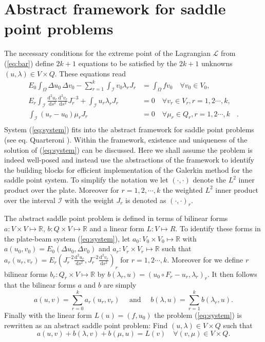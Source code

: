 \documentclass{marine_2015}
\newcommand{\inner}[2]{\ensuremath{\left(#1, #2\right)}}
\newcommand{\rinner}[2]{\ensuremath{\left(#1, #2\right)_r}}
\newcommand{\ainner}[2]{\ensuremath{a\left(#1, #2\right)}}
\newcommand{\arinner}[2]{\ensuremath{a_r\left(#1, #2\right)}}
\newcommand{\binner}[2]{\ensuremath{b\left(#1, #2\right)}}
\newcommand{\brinner}[2]{\ensuremath{b\left(#1, #2\right)}}
\newcommand{\Linner}[1]{\ensuremath{L\left(#1\right)}}
\newcommand{\deriv}[2]{\ensuremath{\frac{\mathrm{d}#1}{\mathrm{d}#2}}}
\newcommand{\tderiv}[2]{\ensuremath{\tfrac{\mathrm{d}#1}{\mathrm{d}#2}}}
\begin{document}
\section{Abstract framework for saddle point problems}
\label{sec:abstract}
The necessary conditions for the extreme point of the Lagrangian $\mathcal{L}$
from (\ref{eq:bar}) define $2k+1$ equations to be satisfied by the $2k+1$
unknowns $\left(u, \lambda\right)\in V\times Q$. These equations read
\[
  \begin{aligned}
    \label{eq:system}
    E_0\displaystyle\int_{\Omega}\Delta u_0\,\Delta v_0-
    \sum_{r=1}^k\int_{\mathcal{I}}v_0\lambda_r J_r &=\displaystyle\int_{\Omega}f
    v_0\quad\forall v_0\in V_0,& \\
    E_r\displaystyle\int_{\mathcal{I}}
    \deriv{^2u_r}{s^2}\deriv{^2v_r}{s^2}J_r^{-3} +
  \int_{\mathcal{I}} u_r \lambda_r J_r &= 0\quad\forall v_r\in V_r, r=1,
    2\cdots, k,&\\
  \int_{\mathcal{I}}\left(u_r-u_0\right)\mu_r J_r &= 0\quad\forall \mu_r\in Q_r,
    r=1, 2\cdots, k&.\\
  \end{aligned}
\]
System (\ref{eq:system}) fits into the abstract framework for saddle point
problems (see eq. Quarteroni \cite{quarteroni}). Within the framework, existence
and uniqueness of the solution of (\ref{eq:system}) can be discussed. Here we
shall assume the problem is indeed well-posed and instead use the abstractions
of the framework to identify the building blocks for efficient implementation
of the Galerkin method for the saddle point system. To simplify the notation we
let $\inner{\cdot}{\cdot}$ denote the $L^2$ inner product over the plate.
Moreover for $r=1, 2, \cdots, k$ the weighted $L^2$ inner product over the
interval $\mathcal{I}$ with the weight $J_r$ is denoted as $\rinner{\cdot}{\cdot}$.

The abstract saddle point problem is defined in terms of bilinear forms $a:V\times V\mapsto \mathbb{R}$,
$b:Q\times V\mapsto \mathbb{R}$ and a linear form $L:V\mapsto R$. To identify these 
forms in the plate-beam system (\ref{eq:system}), let $a_0:V_0\times V_0\mapsto
\mathbb{R}$ with $\ainner{u_0}{v_0}=E_0\inner{\Delta u_0}{\Delta v_0}$ and
$a_r:V_r\times V_r\mapsto \mathbb{R}$ such that $\arinner{u_r}{v_r}=E_r\rinner{J_r^{-2}\tderiv{^2 u_r}{s^2}}{J_r^{-2}\tderiv{^2
v_r}{s^2}}$ for $r=1, 2\cdots, k$. Moreover for we define $r$ bilinear forms
$b_r:Q_r\times V\mapsto\mathbb{R}$ by
$\brinner{\lambda_r}{u}=\rinner{u_0\circ F_r-u_r}{\lambda_r}$. It then follows 
that the bilinear forms $a$ and $b$ are simply
\[
  \ainner{u}{v} = \displaystyle\sum_{r=0}^{k}\arinner{u_r}{v_r}\quad\text{ and
  }\quad\binner{\lambda}{u} = \displaystyle\sum_{r=1}^{k}\brinner{\lambda_r}{u}.
\]
Finally with the linear form $\Linner{u}=\inner{f}{u_0}$ the problem
(\ref{eq:system}) is rewritten as an abstract saddle point problem: Find
$\left(u, \lambda\right)\in V\times Q$ such that
\begin{equation}
  \label{eq:abstract_saddle}
  \ainner{u}{v} + \binner{\lambda}{v} + \binner{\mu}{u} = \Linner{v}\quad\forall
  \left(v, \mu\right)\in V\times Q.
\end{equation}
\end{document}
